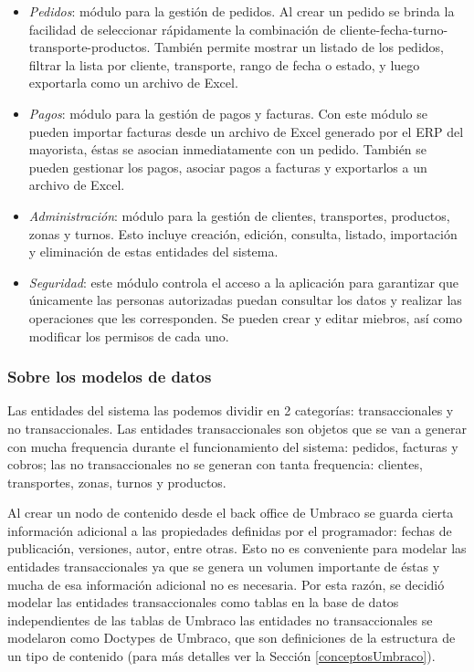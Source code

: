 \begin{itemize}
    \item \emph{Pedidos}: módulo para la gestión de pedidos. Al crear un pedido se brinda la facilidad de seleccionar rápidamente la combinación de cliente-fecha-turno-transporte-productos. También permite mostrar un listado de los pedidos, filtrar la lista por cliente, transporte, rango de fecha o estado, y luego exportarla como un archivo de Excel. 
    \item \emph{Pagos}: módulo para la gestión de pagos y facturas. Con este módulo se pueden importar facturas desde un archivo de Excel generado por el \ac{ERP} del mayorista, éstas se asocian inmediatamente con un pedido. También se pueden gestionar los pagos, asociar pagos a facturas y exportarlos a un archivo de Excel.
    \item \emph{Administración}: módulo para la gestión de clientes, transportes, productos, zonas y turnos. Esto incluye creación, edición, consulta, listado, importación y eliminación de estas entidades del sistema.
    \item \emph{Seguridad}: este módulo controla el acceso a la aplicación para garantizar que únicamente las personas autorizadas puedan consultar los datos y realizar las operaciones que les corresponden. Se pueden crear y editar miebros, así como modificar los permisos de cada uno.
\end{itemize}

\subsubsection{Sobre los modelos de datos}
Las entidades del sistema las podemos dividir en 2 categorías: transaccionales y no transaccionales. Las entidades transaccionales son objetos que se van a generar con mucha frequencia durante el funcionamiento del sistema: pedidos, facturas y cobros; las no transaccionales no se generan con tanta frequencia: clientes, transportes, zonas, turnos y productos.

Al crear un nodo de contenido desde el back office de Umbraco se guarda cierta información adicional a las propiedades definidas por el programador: fechas de publicación, versiones, autor, entre otras. Esto no es conveniente para modelar las entidades transaccionales ya que se genera un volumen importante de éstas y mucha de esa información adicional no es necesaria. Por esta razón, se decidió modelar las entidades transaccionales como tablas en la base de datos independientes de las tablas de Umbraco las entidades no transaccionales se modelaron como Doctypes de Umbraco, que son definiciones de la estructura de un tipo de contenido (para más detalles ver la Sección \ref{conceptosUmbraco}).

